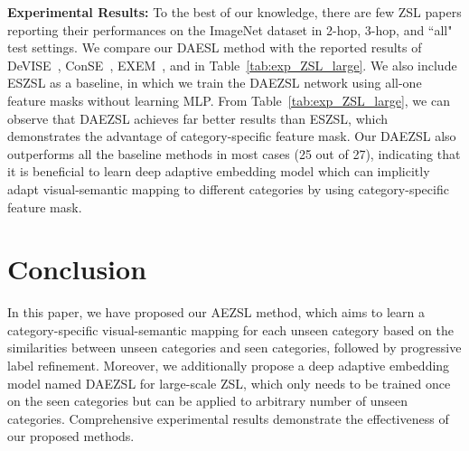 \documentclass[journal]{IEEEtran}
\begin{document}
\noindent\textbf{Experimental Results:} To the best of our knowledge, there are few ZSL papers \cite{frome2013devise,norouzi2013zero,changpinyo2016synthesized,changpinyo2016predicting} reporting their performances on the ImageNet dataset in 2-hop, 3-hop, and ``all" test settings. We compare our DAESL method with the reported results of DeVISE~\cite{frome2013devise}, ConSE~\cite{norouzi2013zero}, EXEM~\cite{changpinyo2016predicting}, and \cite{changpinyo2016synthesized} in Table~\ref{tab:exp_ZSL_large}. We also include ESZSL as a baseline, in which we train the DAEZSL network using all-one feature masks without learning MLP. From Table~\ref{tab:exp_ZSL_large}, we can observe that DAEZSL achieves far better results than ESZSL, which demonstrates the advantage of category-specific feature mask. Our DAEZSL also outperforms all the baseline methods in most cases (25 out of 27), indicating that it is beneficial to learn deep adaptive embedding model which can implicitly adapt visual-semantic mapping to different categories by using category-specific feature mask. 

\section{Conclusion} \label{sec:conclusion}
In this paper, we have proposed our AEZSL method, which aims to learn a category-specific visual-semantic mapping for each unseen category based on the similarities between unseen categories and seen categories, followed by progressive label refinement. Moreover, we additionally propose a deep adaptive embedding model named DAEZSL for large-scale ZSL, which only needs to be trained once on the seen categories but can be applied to arbitrary number of unseen categories. Comprehensive experimental results demonstrate the effectiveness of our proposed methods.









\end{document}
